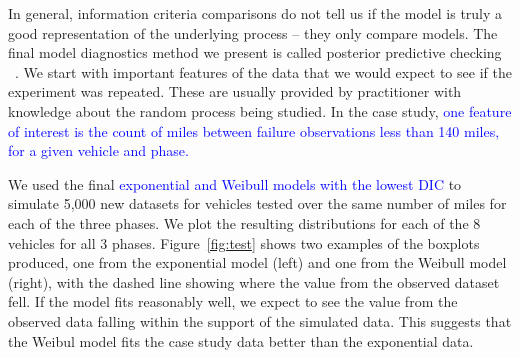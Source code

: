 \documentclass[12pt]{article}
\begin{document}
In general, information criteria
comparisons do not tell us if the model is truly a good representation of the
underlying process -- they only compare models. The final model diagnostics method we present is called
posterior predictive checking ~\cite{ref5}.  We start with important
features of the data that we would expect to see if the experiment was repeated.
These are usually provided by practitioner with knowledge about the random
process being studied. In the case study, \textcolor{blue}{one feature of interest is the count of miles between failure observations less than 140 miles, for a given vehicle and phase.}


We used the final \textcolor{blue}{exponential and Weibull models with the lowest DIC} to simulate 5,000 new datasets for vehicles tested
over the same number of miles for each of the three phases. We plot the resulting distributions for each of the 8 vehicles for all 3 phases. Figure~\ref{fig:test} shows two examples of the boxplots produced, one from the exponential model
(left) and one from the Weibull model (right), with the dashed line showing
where the value from the observed dataset fell. If the model fits reasonably well, we expect to see the value from the observed data falling within the support of the simulated data. This suggests that the Weibul model fits the case study data better than the exponential data.
\end{document}
